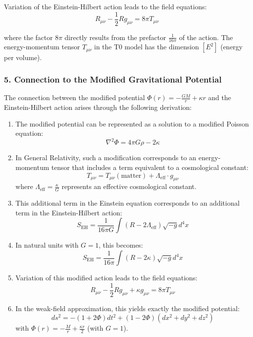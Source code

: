 \documentclass[12pt,a4paper]{article}
\begin{document}
	Variation of the Einstein-Hilbert action leads to the field equations:
	\[
	R_{\mu\nu} - \frac{1}{2}Rg_{\mu\nu} = 8\pi T_{\mu\nu}
	\]
	
	where the factor $8\pi$ directly results from the prefactor $\frac{1}{16\pi}$ of the action. The energy-momentum tensor $T_{\mu\nu}$ in the T0 model has the dimension $[E^2]$ (energy per volume).
	
	\subsubsection*{5. Connection to the Modified Gravitational Potential}
	
	The connection between the modified potential $\Phi(r) = -\frac{GM}{r} + \kappa r$ and the Einstein-Hilbert action arises through the following derivation:
	
	\begin{enumerate}
		\item The modified potential can be represented as a solution to a modified Poisson equation:
		\[
		\nabla^2\Phi = 4\pi G\rho - 2\kappa
		\]
		
		\item In General Relativity, such a modification corresponds to an energy-momentum tensor that includes a term equivalent to a cosmological constant:
		\[
		T_{\mu\nu} = T_{\mu\nu}(\text{matter}) + \Lambda_{\text{eff}} \cdot g_{\mu\nu}
		\]
		where $\Lambda_{\text{eff}} = \frac{\kappa}{G}$ represents an effective cosmological constant.
		
		\item This additional term in the Einstein equation corresponds to an additional term in the Einstein-Hilbert action:
		\[
		S_{\mathrm{EH}} = \frac{1}{16\pi G}\int(R - 2\Lambda_{\text{eff}})\sqrt{-g}d^4x
		\]
		
		\item In natural units with $G = 1$, this becomes:
		\[
		S_{\mathrm{EH}} = \frac{1}{16\pi}\int(R - 2\kappa)\sqrt{-g}d^4x
		\]
		
		\item Variation of this modified action leads to the field equations:
		\[
		R_{\mu\nu} - \frac{1}{2}Rg_{\mu\nu} + \kappa g_{\mu\nu} = 8\pi T_{\mu\nu}
		\]
		
		\item In the weak-field approximation, this yields exactly the modified potential:
		\[
		ds^2 = -(1+2\Phi)dt^2 + (1-2\Phi)(dx^2 + dy^2 + dz^2)
		\]
		with $\Phi(r) = -\frac{M}{r} + \frac{\kappa r}{2}$ (with $G = 1$).
	\end{enumerate}
	
\end{document}
